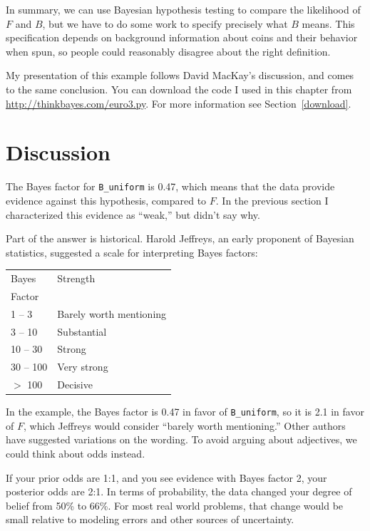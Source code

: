 \documentclass[12pt]{book}
\theoremstyle{exercise}
\begin{document}
In summary, we can use Bayesian hypothesis testing to compare the
likelihood of $F$ and $B$, but we have to do some work to specify
precisely what $B$ means.  This specification depends on background
information about coins and their behavior when spun, so people
could reasonably disagree about the right definition.

My presentation of this example follows
David MacKay's discussion, and comes to the same conclusion.
You can download the code I used in this chapter from
\url{http://thinkbayes.com/euro3.py}.
  For more information
see Section~\ref{download}.

\section{Discussion}

The Bayes factor for \verb"B_uniform" is 0.47, which means
that the data provide evidence against this hypothesis, compared
to $F$.  In the previous section I characterized this evidence
as ``weak,'' but didn't say why.

Part of the answer is historical.  Harold Jeffreys, an early
proponent of Bayesian statistics, suggested a scale for
interpreting Bayes factors:

\begin{tabular}{|l|l|}
\hline
Bayes & Strength \\
Factor & \\
\hline
1 -- 3 & Barely worth mentioning \\
3 -- 10 & Substantial \\
10 -- 30 & Strong \\
30 -- 100 & Very strong \\
$>$ 100 & Decisive \\
\hline
\end{tabular}

In the example, the Bayes factor is 0.47 in favor of \verb"B_uniform",
so it is 2.1 in favor of $F$, which Jeffreys would consider ``barely
worth mentioning.''  Other authors have suggested variations on the
wording.  To avoid arguing about adjectives, we could think about odds
instead.

If your prior odds are 1:1, and you see evidence with Bayes
factor 2, your posterior odds are 2:1.  In terms of probability,
the data changed your degree of belief from 50\% to 66\%.  For
most real world problems, that change would be small relative
to modeling errors and other sources of uncertainty.
\end{document}
